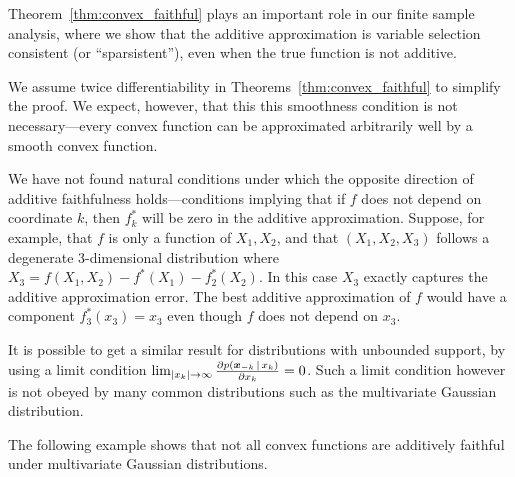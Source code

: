Theorem~\ref{thm:convex_faithful} plays an important role in our
finite sample analysis, where we show that the additive
approximation is variable selection consistent (or ``sparsistent''), even when the true function is not
additive.

\begin{remark}
  We assume twice differentiability in
  Theorems~\ref{thm:convex_faithful} to simplify the proof.  We
  expect, however, that this this smoothness condition is not
  necessary---every convex function can be approximated arbitrarily
  well by a smooth convex function.
\end{remark}

\begin{remark} 
  We have not found natural conditions under which the opposite
  direction of additive faithfulness holds---conditions implying that if $f$ does not
  depend on coordinate $k$, then $f_k^*$ will be zero in the additive
  approximation.  Suppose, for example, that $f$ is only a
  function of $X_1, X_2$, and that $(X_1, X_2, X_3)$ follows a
  degenerate 3-dimensional distribution where $X_3 = f(X_1, X_2) -
  f^*(X_1) - f^*_2(X_2)$.  In this case $X_3$ exactly captures the
  additive approximation error.  The best additive
  approximation of $f$ would have a component $f^*_3(x_3) = x_3$ even
  though $f$ does not depend on $x_3$.
\end{remark}

\begin{remark}
It is possible to get a similar result for distributions with
unbounded support, by using a limit condition $\lim_{|x_k| \rightarrow
  \infty} \frac{\partial p(\mbox{\boldmath $\scriptstyle x$}_{-k} {\,|\,} x_k)}{\partial x_k}
= 0$.  Such a limit condition however is not obeyed by many common distributions such as the multivariate Gaussian distribution. 
\end{remark}

The following example shows that not all convex functions are
additively faithful under multivariate Gaussian distributions.

